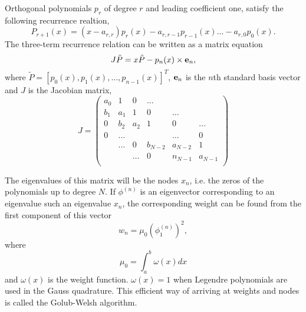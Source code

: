    Orthogonal polynomials $p_r$ of degree $r$ and 
    leading coefficient one, satisfy the following recurrence realtion,
    \begin{equation}
        P_{r+1}(x) = (x - a_{r,r})p_r(x) - a_{r,r-1}p_{r-1}(x) \dots -a_{r,0}p_0(x).
    \end{equation}
    The three-term recurrence relation can be written as a matrix equation
    \begin{equation}
        J\tilde{P} = x\tilde{P} - p_n(x) \times \vb{e}_n,
    \end{equation}
    where $\tilde{P} = [p_0(x),p_1(x),\dots,p_{n-1}(x)]^T$, $\vb{e}_n$ is the $n$th 
    standard basis vector and $J$ is the Jacobian matrix,
    \begin{equation}
        J = \begin{pmatrix}
            a_0 &    1  &    0  & \dots   &         & \\
            b_1 &  a_1  &    1  &    0    & \dots   & \\
            0   &  b_2  &   a_2 &    1    &    0    & \dots\\
            0   & \dots &       &         & \dots   & 0 \\
                & \dots &   0   & b_{N-2} & a_{N-2} & 1 \\
                &       & \dots &      0  & n_{N-1} & a_{N-1} \\
        \end{pmatrix}
    \end{equation}

    The eigenvalues of this matrix will be the nodes $x_n$, i.e. the zeros of the 
    polynomials up to degree $N$. If $\phi^{(n)}$ is an eigenvector corresponding to 
    an eigenvalue such an eigenvalue $x_n$, the corresponding weight can be found 
    from the first component of this vector
    \begin{equation}
        w_n = \mu_0 \left(\phi_1^{(n)} \right)^2,
    \end{equation}
    where 
    \begin{equation*}
        \mu_0 = \int_a^b \omega(x) dx
    \end{equation*}
    and $\omega(x)$ is the weight function. $\omega(x) = 1$ when Legendre polynomials
    are used in the Gauss quadrature. This efficient way of arriving at weights and 
    nodes is called the Golub-Welsh algorithm\cite{golub1969calculation}.
   
